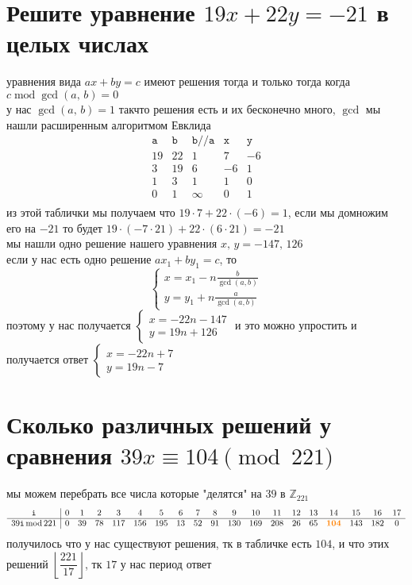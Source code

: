 \documentclass{article}
\newcommand{\orange}[1]{{\color{orange}{#1}}}
\newcommand{\Mod}[1]{\pmod{#1}}
\renewcommand{\mod}{\operatorname{mod}}
\newcommand{\floor}[1]{\left\lfloor {#1} \right\rfloor}
\begin{document}
  \section{Решите уравнение $19x + 22y = -21$ в целых числах}
  уравнения вида $ax+by=c$ имеют решения тогда и только тогда когда $c \mod \gcd(a,\, b) = 0$ \\
  у нас $\gcd(a,\, b) = 1$ такчто решения есть и их бесконечно много, $\gcd$ мы нашли расширенным алгоритмом Евклида
  $$\begin{array}{c|c|c|c|c}
    \texttt{a} & \texttt{b} & \texttt{b//a} & \texttt{x} & \texttt{y} \\
    \hline
    19 & 22 & 1 &  7 & -6 \\
     3 & 19 & 6 & -6 &  1 \\
     1 &  3 & 1 &  1 &  0 \\
     0 &  1 & \infty &  0 &  1 \\
  \end{array}$$
  из этой таблички мы получаем что $19 \cdot 7 + 22 \cdot (-6) = 1$,
  если мы домножим его на $-21$ то будет $19 \cdot (-7 \cdot 21) + 22 \cdot (6 \cdot 21) = -21$ \\
  мы нашли одно решение нашего уравнения $x,\,y = -147,\,126$ \\
  если у нас есть одно решение $ax_1+by_1 = c$, то
  $$\begin{cases}
    x = x_1 - n\frac{b}{\gcd(a,b)} \\
    y = y_1 + n\frac{a}{\gcd(a,b)}
  \end{cases}$$
  поэтому у нас получается
  $\begin{cases}
    x = -22n - 147 \\
    y = 19n + 126
  \end{cases}$
  и это можно упростить и получается ответ
  $\begin{cases}
    x = -22n + 7 \\
    y = 19n - 7
  \end{cases}$

  \section{Сколько различных решений у сравнения $39x \equiv 104 \Mod{221}$}
  мы можем перебрать все числа которые "делятся"{} на $39$ в $\mathbb{Z}_{221}$
  \[
    \begin{array}{c|cccccccccccccccccc}
      \texttt{i} & 0 & 1 & 2 & 3 & 4 & 5 & 6 & 7 & 8 & 9 & 10 & 11 & 12 & 13 & 14 & 15 & 16 & 17 \\
      \hline
      39\texttt{i} \mod 221 & 0 & 39 & 78 & 117 & 156 & 195 & 13 & 52 & 91 & 130 & 169 & 208 & 26 & 65 & \mathbf{\orange{104}} & 143 & 182 & 0 \\
    \end{array}
  \]
  получилось что у нас существуют решения, тк в табличке есть $104$, и что этих решений $\floor{\dfrac{221}{17}}$, тк $17$ у нас период
  ответ 
\end{document}

